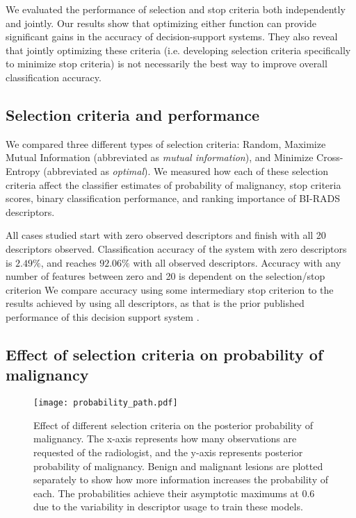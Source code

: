We evaluated the performance of selection and stop criteria both independently and jointly.
Our results show that optimizing either function can provide significant gains in the accuracy of decision-support systems.
They also reveal that jointly optimizing these criteria (i.e. developing selection criteria specifically to minimize stop criteria) is not necessarily the best way to improve overall classification accuracy.

\subsection{Selection criteria and performance}
We compared three different types of selection criteria: Random, Maximize Mutual Information (abbreviated as \emph{mutual information}), and Minimize Cross-Entropy (abbreviated as \emph{optimal}).
We measured how each of these selection criteria affect the classifier estimates of probability of malignancy, stop criteria scores, binary classification performance, and ranking importance of BI-RADS descriptors.

All cases studied start with zero observed descriptors and finish with all 20 descriptors observed.
Classification accuracy of the system with zero descriptors is $2.49\%$, and reaches $92.06\%$ with all observed descriptors.
Accuracy with any number of features between zero and 20 is dependent on the selection/stop criterion
We compare accuracy using some intermediary stop criterion to the results achieved by using all descriptors, as that is the prior published performance of this decision support system \cite{Gimenez:2014tr,Burnside:2009br}.

\subsection{Effect of selection criteria on probability of malignancy}
\begin{figure}[h]
	\centering
	\texttt{[image: probability\_path.pdf]}
	\caption[Effect of selection criteria on probability of malignancy]{Effect of different selection criteria on the posterior probability of malignancy. The x-axis represents how many observations are requested of the radiologist, and the y-axis represents posterior probability of malignancy. Benign and malignant lesions are plotted separately to show how more information increases the probability of each. The probabilities achieve their asymptotic maximums at 0.6 due to the variability in descriptor usage to train these models. }
	\label{fig:feedback_mammo}
\end{figure}


